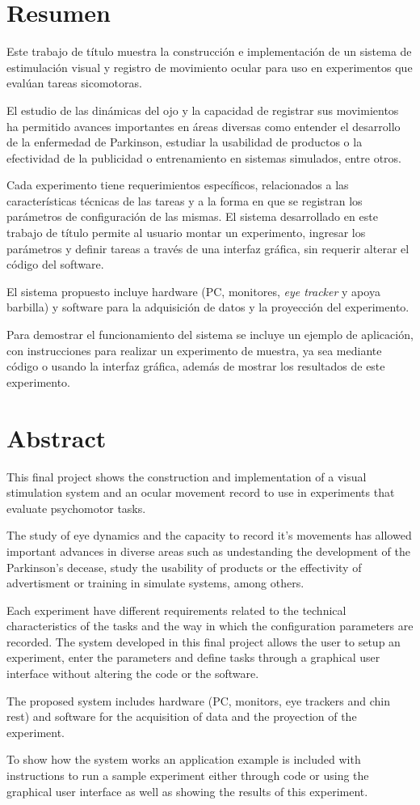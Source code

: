 \documentclass[\main/Main.tex]{subfiles}
\begin{document}
\chapter{Resumen}
	Este trabajo de título muestra la construcción e implementación de un sistema de estimulación visual y registro de movimiento ocular para uso en experimentos que evalúan tareas sicomotoras.

	El estudio de las dinámicas del ojo y la capacidad de registrar sus movimientos ha permitido avances importantes en áreas diversas como entender el desarrollo de la enfermedad de Parkinson, estudiar la usabilidad de productos o la efectividad de la publicidad o entrenamiento en sistemas simulados, entre otros. 

	Cada experimento tiene requerimientos específicos, relacionados a las características técnicas de las tareas y a la forma en que se registran los parámetros de configuración de las mismas. El sistema desarrollado en este trabajo de título permite al usuario montar un experimento, ingresar los parámetros y definir tareas a través de una interfaz gráfica, sin requerir alterar el código del software. 

	El sistema propuesto incluye hardware (PC, monitores, \textit{eye tracker} y apoya barbilla) y software para la adquisición de datos y la proyección del experimento.

	Para demostrar el funcionamiento del sistema se incluye un ejemplo de aplicación, con instrucciones para realizar un experimento de muestra, ya sea mediante código o usando la interfaz gráfica, además de mostrar los resultados de este experimento.

	
\chapter{Abstract}
	This final project shows the construction and implementation of a visual stimulation system and an ocular movement record to use in experiments that evaluate psychomotor tasks.
	
	The study of eye dynamics and the capacity to record it's movements has allowed important advances in diverse areas such as undestanding the development of the Parkinson's decease, study the usability of products or the effectivity of advertisment or training in simulate systems, among others. 
	
	Each experiment have different requirements related to the technical characteristics of the tasks and the way in which the configuration parameters are recorded. The system developed in this final project allows the user to setup an experiment, enter the parameters and define tasks through a graphical user interface without altering the code or the software.
	
	The proposed system includes hardware (PC, monitors, eye trackers and chin rest) and software for the acquisition of data and the proyection of the experiment.
	
	To show how the system works an application example is included with instructions to run a sample experiment either through code or using the graphical user interface as well as showing the results of this experiment. 
	 
\end{document}
